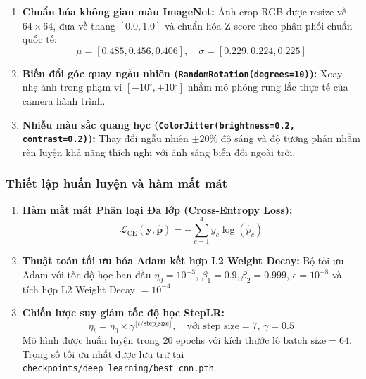 \begin{enumerate}
    \item \textbf{Chuẩn hóa không gian màu ImageNet:} Ảnh crop RGB được resize về $64 \times 64$, đưa về thang $[0.0, 1.0]$ và chuẩn hóa Z-score theo phân phối chuẩn quốc tế:
    \begin{equation}
        \mu = [0.485, 0.456, 0.406], \quad \sigma = [0.229, 0.224, 0.225]
        \label{eq:imagenet_norm}
    \end{equation}
    \item \textbf{Biến đổi góc quay ngẫu nhiên (\texttt{RandomRotation(degrees=10)}):} Xoay nhẹ ảnh trong phạm vi $[-10^\circ, +10^\circ]$ nhằm mô phỏng rung lắc thực tế của camera hành trình.
    \item \textbf{Nhiễu màu sắc quang học (\texttt{ColorJitter(brightness=0.2, contrast=0.2)}):} Thay đổi ngẫu nhiên $\pm 20\%$ độ sáng và độ tương phản nhằm rèn luyện khả năng thích nghi với ánh sáng biến đổi ngoài trời.
\end{enumerate}

\subsubsection{Thiết lập huấn luyện và hàm mất mát}
\label{subsubsec:lenet_training}

\begin{enumerate}
    \item \textbf{Hàm mất mát Phân loại Đa lớp (Cross-Entropy Loss):}
    \begin{equation}
        \mathcal{L}_{\text{CE}}(\mathbf{y}, \hat{\mathbf{p}}) = -\sum_{c=1}^4 y_c \log(\hat{p}_c)
        \label{eq:ce_loss}
    \end{equation}
    \item \textbf{Thuật toán tối ưu hóa Adam kết hợp L2 Weight Decay:} Bộ tối ưu Adam với tốc độ học ban đầu $\eta_0 = 10^{-3}$, $\beta_1 = 0.9, \beta_2 = 0.999$, $\epsilon = 10^{-8}$ và tích hợp L2 Weight Decay $= 10^{-4}$.
    \item \textbf{Chiến lược suy giảm tốc độ học StepLR:}
    \begin{equation}
        \eta_t = \eta_0 \times \gamma^{\lfloor t / \text{step\_size} \rfloor}, \quad \text{với } \text{step\_size} = 7, \, \gamma = 0.5
        \label{eq:steplr}
    \end{equation}
    Mô hình được huấn luyện trong 20 epochs với kích thước lô $\text{batch\_size} = 64$. Trọng số tối ưu nhất được lưu trữ tại \texttt{checkpoints/deep\_learning/best\_cnn.pth}.
\end{enumerate}

